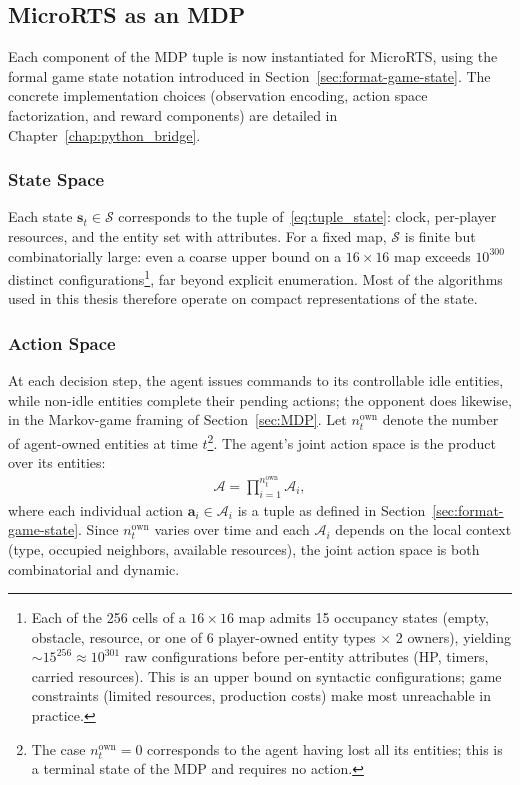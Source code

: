 \subsection{MicroRTS as an MDP}
\label{subsec:microrts_mdp}

Each component of the MDP tuple is now instantiated for MicroRTS, using the formal game state notation introduced in Section~\ref{sec:format-game-state}. The concrete implementation choices (observation encoding, action space factorization, and reward components) are detailed in Chapter~\ref{chap:python_bridge}.

\subsubsection{State Space}

Each state $\boldsymbol{s}_t \in \mathcal{S}$ corresponds to the tuple of~\ref{eq:tuple_state}: clock, per-player resources, and the entity set with attributes. For a fixed map, $\mathcal{S}$ is finite but combinatorially large: even a coarse upper bound on a $16{\times}16$ map exceeds $10^{300}$ distinct configurations\footnote{Each of the 256 cells of a $16\times16$ map admits 15 occupancy states (empty, obstacle, resource, or one of 6 player-owned entity types $\times$ 2 owners), yielding $\sim 15^{256} \approx 10^{301}$ raw configurations before per-entity attributes (HP, timers, carried resources). This is an upper bound on syntactic configurations; game constraints (limited resources, production costs) make most unreachable in practice.}, far beyond explicit enumeration. Most of the algorithms used in this thesis therefore operate on compact representations of the state.

\subsubsection{Action Space}

At each decision step, the agent issues commands to its controllable idle entities, while non-idle entities complete their pending actions; the opponent does likewise, in the Markov-game framing of Section~\ref{sec:MDP}. Let $n_t^{\text{own}}$ denote the number of agent-owned entities at time $t$\footnote{The case $n_t^{\text{own}} = 0$ corresponds to the agent having lost all 
its entities; this is a terminal state of the MDP and requires no action.}. The agent's joint action space is the product over its entities:
\begin{align}
\mathcal{A} = \prod_{i=1}^{n_t^{\text{own}}} \mathcal{A}_i,
\end{align}
where each individual action $\boldsymbol{a}_i \in \mathcal{A}_i$ is a tuple as defined in Section~\ref{sec:format-game-state}. Since $n_t^{\text{own}}$ varies over time and each $\mathcal{A}_i$ depends on the local context (type, occupied neighbors, available resources), the joint action space is both combinatorial and dynamic.

